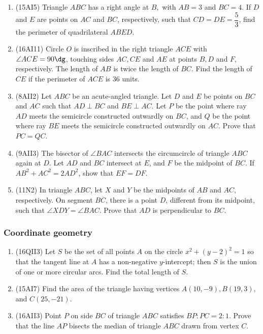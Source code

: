 \documentclass[10pt,paper=letter]{scrartcl}
\begin{document}
\begin{enumerate}

\item (15AI5) Triangle $ABC$ has a right angle at $B,$ with $AB = 3$ and $BC = 4$. If $D$ and $E$ are points on $AC$ and $BC$, respectively, such that $CD = DE = \dfrac{5}{3}$, find the perimeter of quadrilateral $ABED$.

\item (16AI11) Circle $O$ is inscribed in the right triangle $ACE$ with $\angle ACE = 90\dg$, touching sides $AC, CE$ and $AE$ at points $B, D$ and $F$, respectively. The length of $AB$ is twice the length of $BC$. Find the length of $CE$ if the perimeter of $ACE$ is $36$ units.

\item (8AII2) Let $ABC$ be an acute-angled triangle. Let $D$ and $E$ be points on $BC$ and $AC$ such that $AD \perp BC$ and $BE \perp AC$. Let $P$ be the point where ray $AD$ meets the semicircle constructed outwardly on $BC$, and $Q$ be the point where ray $BE$ meets the semicircle constructed outwardly on $AC$. Prove that $PC = QC$.

\item (9AII3) The bisector of $\angle BAC$ intersects the circumcircle of triangle $ABC$ again at $D$. Let $AD$ and $BC$ intersect at $E$, and $F$ be the midpoint of $BC$. If $AB^2 + AC^2 = 2AD^2$, show that $EF = DF$.

\item (11N2) In triangle $ABC$, let $X$ and $Y$ be the midpoints of $AB$ and $AC$, respectively. On segment $BC$, there is a point $D$, different from its midpoint, such that $\angle XDY = \angle BAC$. Prove that $AD$ is perpendicular to $BC$.

\end{enumerate}

\subsubsection*{Coordinate geometry}

\begin{enumerate}

\item (16QII3) Let $S$ be the set of all points $A$ on the circle $x^2 + (y-2)^2 = 1$ so that the tangent line at $A$ has a non-negative $y$-intercept; then $S$ is the union of one or more circular arcs. Find the total length of $S$.

\item (15AI7) Find the area of the triangle having vertices $A(10, -9), B(19,3),$ and $C(25,-21)$.

\item (16AII3) Point $P$ on side $BC$ of triangle $ABC$ satisfies $BP : PC = 2 : 1$. Prove that the line $AP$ bisects the median of triangle $ABC$ drawn from vertex $C$.

\end{enumerate}
\end{document}
